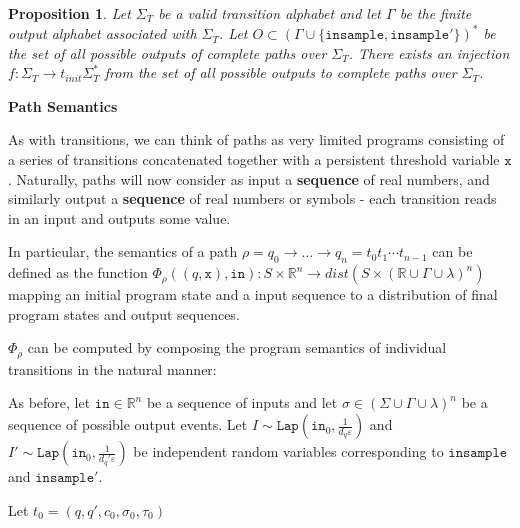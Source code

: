 \documentclass[12pt]{article}
\newcommand{\RR}{\mathbb{R}}
\newcommand{\Lap}{\texttt{Lap}}
\newtheorem{prop}[thm]{Proposition}
\theoremstyle{definition}
\begin{document}
\begin{prop}
    Let $\Sigma_T$ be a valid transition alphabet and let $\Gamma$ be the finite output alphabet associated with $\Sigma_T$. Let $O\subset (\Gamma\cup\{\texttt{insample}, \texttt{insample}'\})^*$ be the set of all possible outputs of complete paths over $\Sigma_T$. There exists an injection $f: \Sigma_T\to t_{init}\Sigma_T^*$ from the set of all possible outputs to complete paths over $\Sigma_T$. 
\end{prop}

\textbf{Path Semantics}

As with transitions, we can think of paths as very limited programs consisting of a series of transitions concatenated together with a persistent threshold variable $\texttt{x}$. Naturally, paths will now consider as input a \textbf{sequence} of real numbers, and similarly output a \textbf{sequence} of real numbers or symbols - each transition reads in an input and outputs some value.

In particular, the semantics of a path $\rho = q_0\to \ldots \to q_n = t_0t_1\cdots t_{n-1}$ can be defined as the function $\Phi_{\rho}((q, \texttt{x}), \texttt{in}): S\times \RR^n\to dist(S\times (\RR\cup\Gamma\cup\lambda)^n)$ mapping an initial program state and a input sequence to a distribution of final program states and output sequences. 

$\Phi_{\rho}$ can be computed by composing the program semantics of individual transitions in the natural manner:

As before, let $\texttt{in}\in \RR^n$ be a sequence of inputs and let $\sigma \in (\Sigma\cup\Gamma\cup\lambda)^n$ be a sequence of possible output events.
Let $I\sim \Lap(\texttt{in}_0, \frac{1}{d_q\varepsilon})$ and $I'\sim \Lap(\texttt{in}_0, \frac{1}{d_q'\varepsilon})$ be independent random variables corresponding to $\texttt{insample}$ and $\texttt{insample}'$. 

Let $t_0 = (q, q', c_0, \sigma_0, \tau_0)$
\end{document}
